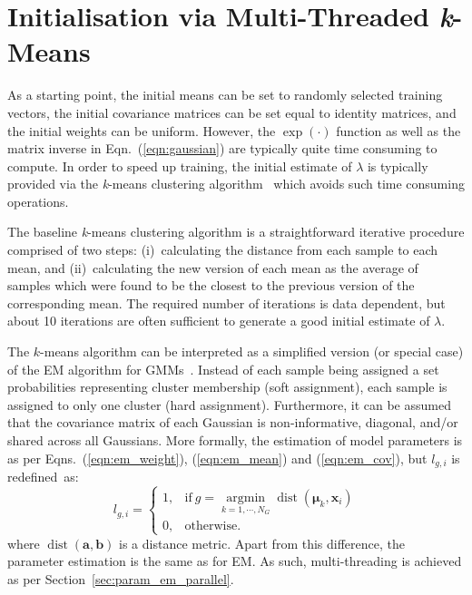 \documentclass[10pt,a4paper]{article}
\DeclareMathOperator*{\argmin}{argmin}
\def\Vec#1{{\boldsymbol{#1}}}
\begin{document}
\section{Initialisation via Multi-Threaded {\it k}-Means}
\label{sec:param_km}

As a starting point, the initial means can be set to randomly selected training vectors,
the initial covariance matrices can be set equal to identity matrices, 
and the initial weights can be uniform.
However, the $\exp(\cdot)$ function as well as the matrix inverse in Eqn.~(\ref{eqn:gaussian}) are typically quite time consuming to compute.
In order to speed up training, the initial estimate of $\lambda$ is typically provided via the {\it k}-means clustering algorithm~\cite{Bishop_2006,Duda01,Kulis_2012}
which avoids such time consuming operations.

The baseline {\it k}-means clustering algorithm is a straightforward iterative procedure comprised of two steps:
(i)~calculating the distance from each sample to each mean,
and
(ii)~calculating the new version of each mean as the average of samples which were found to be the closest to the previous version of the corresponding mean.
The required number of iterations is data dependent,
but about 10 iterations are often sufficient to generate a good initial estimate of $\lambda$.

The $k$-means algorithm can be interpreted as a simplified version (or special case) of the EM algorithm for GMMs~\cite{Kulis_2012}.
Instead of each sample being assigned a set probabilities representing cluster membership (soft assignment),
each sample is assigned to only one cluster (hard assignment).
Furthermore, it can be assumed that the covariance matrix of each Gaussian is non-informative, diagonal, and/or shared across all Gaussians.
More formally, the estimation of model parameters is as per Eqns.~(\ref{eqn:em_weight}), (\ref{eqn:em_mean}) and (\ref{eqn:em_cov}), 
but $l_{g,i}$ is redefined~as:%
%
\begin{equation}
  l_{g,i} = \left\{
  \begin{array}{ll}
  1, & \mbox{if} ~ g = \argmin\limits_{k=1, \cdots, N_G} \operatorname{dist}(\Vec{\mu}_k, \Vec{x}_i) \\
  0, & \mbox{otherwise}.
  \end{array}
  \right.
  \label{eqn:binary_likelihood}
\end{equation}
%
where {$\operatorname{dist}(\Vec{a}, \Vec{b})$} is a distance metric.
Apart from this difference, the parameter estimation is the same as for EM.
As such, multi-threading is achieved as per Section~\ref{sec:param_em_parallel}.
\end{document}
